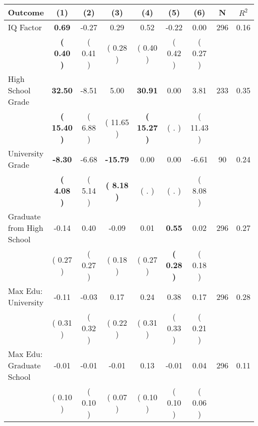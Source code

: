 \begin{tabular}{lcccccccc}
\toprule
 \textbf{Outcome} & \textbf{(1)} & \textbf{(2)} & \textbf{(3)} & \textbf{(4)} & \textbf{(5)} & \textbf{(6)} & \textbf{N} & \textbf{$ R^2$} \\
\midrule
IQ Factor & \textbf{     0.69} &     -0.27 &      0.29 &      0.52 &     -0.22 &      0.00 & 296 &       0.16 \\ 
 & \textbf{(     0.40 )} & (     0.41 ) & (     0.28 ) & (     0.40 ) & (     0.42 ) & (     0.27 ) & \\
High School Grade & \textbf{    32.50} &     -8.51 &      5.00 & \textbf{    30.91} &      0.00 &      3.81 & 233 &       0.35 \\ 
 & \textbf{(    15.40 )} & (     6.88 ) & (    11.65 ) & \textbf{(    15.27 )} & (        . ) & (    11.43 ) & \\
University Grade & \textbf{    -8.30} &     -6.68 & \textbf{   -15.79} &      0.00 &      0.00 &     -6.61 & 90 &       0.24 \\ 
 & \textbf{(     4.08 )} & (     5.14 ) & \textbf{(     8.18 )} & (        . ) & (        . ) & (     8.08 ) & \\
Graduate from High School &     -0.14 &      0.40 &     -0.09 &      0.01 & \textbf{     0.55} &      0.02 & 296 &       0.27 \\ 
 & (     0.27 ) & (     0.27 ) & (     0.18 ) & (     0.27 ) & \textbf{(     0.28 )} & (     0.18 ) & \\
Max Edu: University &     -0.11 &     -0.03 &      0.17 &      0.24 &      0.38 &      0.17 & 296 &       0.28 \\ 
 & (     0.31 ) & (     0.32 ) & (     0.22 ) & (     0.31 ) & (     0.33 ) & (     0.21 ) & \\
Max Edu: Graduate School &     -0.01 &     -0.01 &     -0.01 &      0.13 &     -0.01 &      0.04 & 296 &       0.11 \\ 
 & (     0.10 ) & (     0.10 ) & (     0.07 ) & (     0.10 ) & (     0.10 ) & (     0.06 ) & \\
\bottomrule
\end{tabular}
